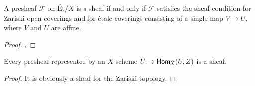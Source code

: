 \begin{theorem}
  A presheaf $\mathcal{F}$ on $\text{\'Et}/X$ is a sheaf if and only if $\mathcal{F}$ satisfies the sheaf condition for Zariski open coverings and for \'etale coverings consisting of a single map $V \to U$, where $V$ and $U$ are affine.
\end{theorem}
\begin{proof}
  \cite{milneLEC}.
\end{proof}
\begin{corollary}
  Every presheaf represented by an $X$-scheme $U \to \mathsf{Hom}_X(U,Z)$ is a sheaf. 
\end{corollary}
\begin{proof}
  It is obviously a sheaf for the Zariski topology. 
\end{proof}
%
%
%
%
%
%
%
%
%
%
